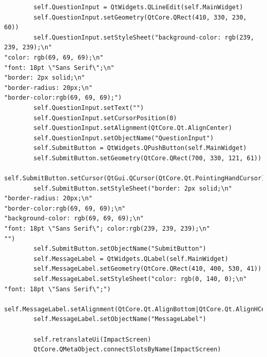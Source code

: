 \documentclass{article}
\begin{document}
\begin{lstlisting}
        self.QuestionInput = QtWidgets.QLineEdit(self.MainWidget)
        self.QuestionInput.setGeometry(QtCore.QRect(410, 330, 230, 60))
        self.QuestionInput.setStyleSheet("background-color: rgb(239, 239, 239);\n"
"color: rgb(69, 69, 69);\n"
"font: 18pt \"Sans Serif\";\n"
"border: 2px solid;\n"
"border-radius: 20px;\n"
"border-color:rgb(69, 69, 69);")
        self.QuestionInput.setText("")
        self.QuestionInput.setCursorPosition(0)
        self.QuestionInput.setAlignment(QtCore.Qt.AlignCenter)
        self.QuestionInput.setObjectName("QuestionInput")
        self.SubmitButton = QtWidgets.QPushButton(self.MainWidget)
        self.SubmitButton.setGeometry(QtCore.QRect(700, 330, 121, 61))
        self.SubmitButton.setCursor(QtGui.QCursor(QtCore.Qt.PointingHandCursor))
        self.SubmitButton.setStyleSheet("border: 2px solid;\n"
"border-radius: 20px;\n"
"border-color:rgb(69, 69, 69);\n"
"background-color: rgb(69, 69, 69);\n"
"font: 18pt \"Sans Serif\"; color:rgb(239, 239, 239);\n"
"")
        self.SubmitButton.setObjectName("SubmitButton")
        self.MessageLabel = QtWidgets.QLabel(self.MainWidget)
        self.MessageLabel.setGeometry(QtCore.QRect(410, 400, 530, 41))
        self.MessageLabel.setStyleSheet("color: rgb(0, 140, 0);\n"
"font: 18pt \"Sans Serif\";")
        self.MessageLabel.setAlignment(QtCore.Qt.AlignBottom|QtCore.Qt.AlignHCenter)
        self.MessageLabel.setObjectName("MessageLabel")

        self.retranslateUi(ImpactScreen)
        QtCore.QMetaObject.connectSlotsByName(ImpactScreen)


\end{lstlisting}
\end{document}
